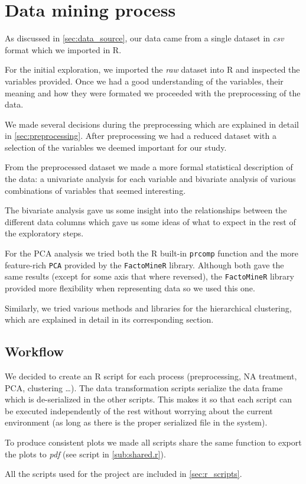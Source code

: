 

\section{Data mining process}%
\label{sec:data_mining_process}

As discussed in \cref{sec:data_source}, our data came from a single dataset
in \emph{csv} format which we imported in R.

For the initial exploration, we imported the \emph{raw} dataset into R and
inspected the variables provided. Once we had a good understanding of the
variables, their meaning and how they were formated we proceeded with the
preprocessing of the data.

We made several decisions during the preprocessing which are explained in detail
in \cref{sec:preprocessing}. After preprocessing we had a reduced dataset with
a selection of the variables we deemed important for our study.

From the preprocessed dataset we made a more formal statistical description of
the data: a univariate analysis for each variable and bivariate analysis of
various combinations of variables that seemed interesting.


The bivariate analysis gave us some insight into the relationships between the
different data columns which gave us some ideas of what to expect in the rest of
the exploratory steps.

For the PCA analysis we tried both the R built-in \texttt{prcomp} function and
the more feature-rich \texttt{PCA} provided by the \texttt{FactoMineR} library.
Although both gave the same results (except for some axis that where reversed),
the \texttt{FactoMineR} library provided more flexibility when representing data
so we used this one.

Similarly, we tried various methods and libraries for the hierarchical
clustering, which are explained in detail in its corresponding section.

\subsection{Workflow}%
\label{sub:workflow}

We decided to create an R script for each process (preprocessing, NA treatment,
PCA, clustering \dots). The data transformation scripts serialize the data frame
which is de-serialized in the other scripts. This makes it so that each script
can be executed independently of the rest without worrying about the current
environment (as long as there is the proper serialized file in the system).

To produce consistent plots we made all scripts share the same function to
export the plots to \emph{pdf} (see script in \cref{sub:shared.r}).

All the scripts used for the project are included in \cref{sec:r_scripts}.
